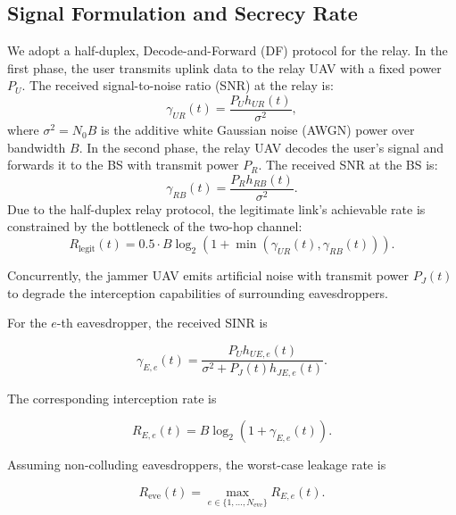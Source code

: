 \documentclass[journal,onecolumn]{IEEEtran}
\begin{document}
\subsection{Signal Formulation and Secrecy Rate}
We adopt a half-duplex, Decode-and-Forward (DF) protocol for the relay. In the first phase, the user transmits uplink data to the relay UAV with a fixed power $P_U$. The received signal-to-noise ratio (SNR) at the relay is:
\begin{equation}
    \gamma_{UR}(t) = \frac{P_U h_{UR}(t)}{\sigma^2},
\end{equation}
where $\sigma^2 = N_0 B$ is the additive white Gaussian noise (AWGN) power over bandwidth $B$.
In the second phase, the relay UAV decodes the user's signal and forwards it to the BS with transmit power $P_R$. The received SNR at the BS is:
\begin{equation}
    \gamma_{RB}(t) = \frac{P_R h_{RB}(t)}{\sigma^2}.
\end{equation}
Due to the half-duplex relay protocol, the legitimate link's achievable rate is constrained by the bottleneck of the two-hop channel:
\begin{equation}
    R_{\text{legit}}(t) = 0.5 \cdot B \log_2\left(1 + \min\left(\gamma_{UR}(t), \gamma_{RB}(t)\right)\right).
\end{equation}

Concurrently, the jammer UAV emits artificial noise with transmit power
$P_J(t)$ to degrade the interception capabilities of surrounding
eavesdroppers.

For the $e$-th eavesdropper, the received SINR is

\begin{equation}
\gamma_{E,e}(t)
=
\frac{P_U h_{UE,e}(t)}
{\sigma^2 + P_J(t)h_{JE,e}(t)}.
\end{equation}

The corresponding interception rate is

\begin{equation}
R_{E,e}(t)
=
B\log_2
\left(
1+\gamma_{E,e}(t)
\right).
\end{equation}

Assuming non-colluding eavesdroppers, the worst-case leakage rate is

\begin{equation}
R_{\text{eve}}(t)
=
\max_{e\in\{1,\ldots,N_{\text{eve}}\}}
R_{E,e}(t).
\end{equation}

\end{document}
